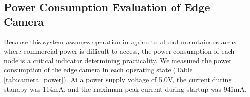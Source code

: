 \documentclass[conference]{IEEEtran}
\begin{document}
\begin{table}[tb]
    \caption{System Components}
    \label{tab:components}
    \vspace{-0.2cm}
    \begin{center}\footnotesize
    \end{center}
    \vspace{-0.4cm}
\end{table}

\subsection{Power Consumption Evaluation of Edge Camera}
Because this system assumes operation in agricultural and mountainous areas where commercial power is difficult to access, the power consumption of each node is a critical indicator determining practicality. We measured the power consumption of the edge camera in each operating state (Table \ref{tab:camera_power}). At a power supply voltage of 5.0V, the current during standby was 114mA, and the maximum peak current during startup was 946mA.
\end{document}
